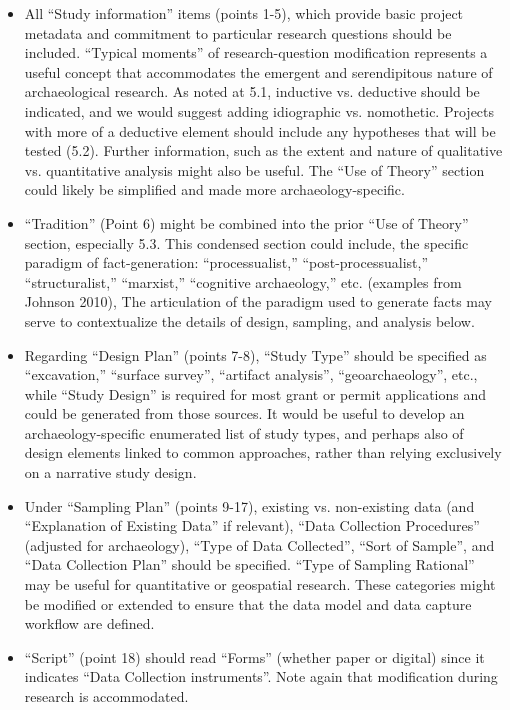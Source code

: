 \documentclass[article]{sa}
\begin{document}
\begin{itemize}
\item  All ``Study information'' items (points 1-5), which provide basic
  project metadata and commitment to particular research questions
  should be included. ``Typical moments'' of research-question
  modification represents a useful concept that accommodates the
  emergent and serendipitous nature of archaeological research. As noted
  at 5.1, inductive vs. deductive should be indicated, and we would
  suggest adding idiographic vs. nomothetic. Projects with more of a
  deductive element should include any hypotheses that will be tested
  (5.2). Further information, such as the extent and nature of
  qualitative vs. quantitative analysis might also be useful. The ``Use
  of Theory'' section could likely be simplified and made more
  archaeology-specific.
\item   ``Tradition'' (Point 6) might be combined into the prior ``Use of Theory''
  section, especially 5.3. This condensed section could include, the
  specific paradigm of fact-generation: ``processualist,''
  ``post-processualist,'' ``structuralist,'' ``marxist,'' ``cognitive
  archaeology,'' etc. (examples from Johnson 2010), The articulation of
  the paradigm used to generate facts may serve to contextualize the
  details of design, sampling, and analysis below.
 \item  Regarding ``Design Plan'' (points 7-8), ``Study Type'' should be
  specified as ``excavation,'' ``surface survey'', ``artifact
  analysis'', ``geoarchaeology'', etc., while ``Study Design'' is
  required for most grant or permit applications and could be generated
  from those sources. It would be useful to develop an
  archaeology-specific enumerated list of study types, and perhaps also
  of design elements linked to common approaches, rather than relying
  exclusively on a narrative study design.
 
\item   Under ``Sampling Plan'' (points 9-17), existing vs. non-existing data
  (and ``Explanation of Existing Data'' if relevant), ``Data Collection
  Procedures'' (adjusted for archaeology), ``Type of Data Collected'',
  ``Sort of Sample'', and ``Data Collection Plan'' should be specified.
  ``Type of Sampling Rational'' may be useful for quantitative or
  geospatial research. These categories might be modified or extended to
  ensure that the data model and data capture workflow are defined.

\item   ``Script'' (point 18) should read ``Forms'' (whether paper or digital)
  since it indicates ``Data Collection instruments''. Note again that
  modification during research is accommodated.


\end{itemize}
\end{document}
